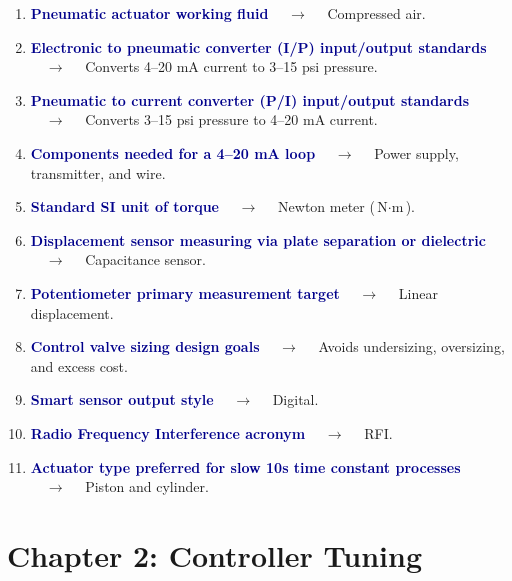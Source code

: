\documentclass[11pt,a4paper]{article}
\begin{document}
\begin{enumerate}[label=\arabic*., leftmargin=*, labelsep=0.8em, itemsep=0.35em, parsep=0.1em, topsep=0.2em]
  \item \textcolor{darkblue}{\textbf{Pneumatic actuator working fluid}} $\quad\to\quad$ Compressed air.
  \item \textcolor{darkblue}{\textbf{Electronic to pneumatic converter (I/P) input/output standards}} $\quad\to\quad$ Converts 4–20 mA current to 3–15 psi pressure.
  \item \textcolor{darkblue}{\textbf{Pneumatic to current converter (P/I) input/output standards}} $\quad\to\quad$ Converts 3–15 psi pressure to 4–20 mA current.
  \item \textcolor{darkblue}{\textbf{Components needed for a 4–20 mA loop}} $\quad\to\quad$ Power supply, transmitter, and wire.
  \item \textcolor{darkblue}{\textbf{Standard SI unit of torque}} $\quad\to\quad$ Newton meter ($\text{N}\cdot\text{m}$).
  \item \textcolor{darkblue}{\textbf{Displacement sensor measuring via plate separation or dielectric}} $\quad\to\quad$ Capacitance sensor.
  \item \textcolor{darkblue}{\textbf{Potentiometer primary measurement target}} $\quad\to\quad$ Linear displacement.
  \item \textcolor{darkblue}{\textbf{Control valve sizing design goals}} $\quad\to\quad$ Avoids undersizing, oversizing, and excess cost.
  \item \textcolor{darkblue}{\textbf{Smart sensor output style}} $\quad\to\quad$ Digital.
  \item \textcolor{darkblue}{\textbf{Radio Frequency Interference acronym}} $\quad\to\quad$ RFI.
  \item \textcolor{darkblue}{\textbf{Actuator type preferred for slow 10s time constant processes}} $\quad\to\quad$ Piston and cylinder.
\end{enumerate}

\section*{Chapter 2: Controller Tuning}
\end{document}
